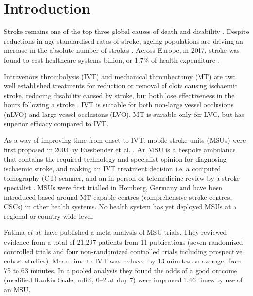 \section{Introduction}


Stroke remains one of the top three global causes of death and disability \cite{feigin_global_2021}. Despite reductions in age-standardised rates of stroke, ageing populations are driving an increase in the absolute number of strokes \cite{feigin_global_2021}. Across Europe, in 2017, stroke was found to cost healthcare systems  billion, or 1.7\% of health expenditure \cite{luengo-fernandez_economic_2020}.

Intravenous thrombolysis (IVT) and mechanical thrombectomy (MT) are two well established treatments for reduction or removal of clots causing ischaemic stroke, reducing disability caused by stroke, but both lose effectiveness in the hours following a stroke \cite{emberson_effect_2014, fransen_time_2016}. IVT is suitable for both non-large vessel occlusions (nLVO) and large vessel occlusions (LVO). MT is suitable only for LVO, but has superior efficacy compared to IVT.


As a way of improving time from onset to IVT, mobile stroke units (MSUs) were first proposed in 2003 by Fassbender et al. \cite{fassbender_mobile_2003}. An MSU is a bespoke ambulance that contains the required technology and specialist opinion for diagnosing ischaemic stroke, and making an IVT treatment decision i.e. a computed tomography (CT) scanner, and an in-person or telemedicine review by a stroke specialist \cite{taqui_reduction_2017}. MSUs were first trialled in Homberg, Germany \cite{walter_diagnosis_2012} and have been introduced based around MT-capable centres (comprehensive stroke centres, CSCs)  in other health systems. No health system has yet deployed MSUs at a regional or country wide level.

Fatima \textit{et al}. \cite{fatima_mobile_2020} have published a meta-analysis of MSU trials. They reviewed evidence from a total of 21,297 patients from 11 publications (seven randomized controlled trials and four non-randomized controlled trials including prospective cohort studies). Mean time to IVT was reduced by 13 minutes on average, from 75 to 63 minutes. In a pooled analysis they found the odds of a good outcome (modified Rankin Scale, mRS, 0–2 at day 7) were improved 1.46 times by use of an MSU.

